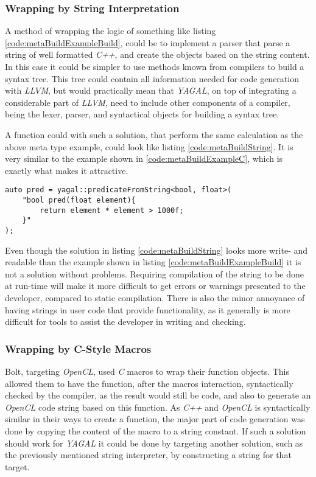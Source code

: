 \subsubsection{Wrapping by String Interpretation}
A method of wrapping the logic of something like listing \ref{code:metaBuildExampleBuild}, could be to implement a parser that parse a string of well formatted \textit{C++}, and create the objects based on the string content. In this case it could be simpler to use methods known from compilers to build a syntax tree. This tree could contain all information needed for code generation with \textit{LLVM}, but would practically mean that \textit{YAGAL}, on top of integrating a considerable part of \textit{LLVM}, need to include other components of a compiler, being the lexer, parser, and syntactical objects for building a syntax tree.

A function could with such a solution, that perform the same calculation as the above meta type example, could look like listing \ref{code:metaBuildString}. It is very similar to the example shown in \ref{code:metaBuildExampleC}, which is exactly what makes it attractive. 

\begin{lstlisting}[caption={Code showing possible construction of kernel with string interpretation.}, label={code:metaBuildString}]
auto pred = yagal::predicateFromString<bool, float>(
    "bool pred(float element){
        return element * element > 1000f;
    }"
);
\end{lstlisting}

Even though the solution in listing \ref{code:metaBuildString} looks more write- and readable than the example shown in listing \ref{code:metaBuildExampleBuild} it is not a solution without problems. Requiring compilation of the string to be done at run-time will make it more difficult to get errors or warnings presented to the developer, compared to static compilation. There is also the minor annoyance of having strings in user code that provide functionality, as it generally is more difficult for tools to assist the developer in writing and checking.

\subsubsection{Wrapping by C-Style Macros}
Bolt, targeting \textit{OpenCL}, used \textit{C} macros to wrap their function objects. This allowed them to have the function, after the macros interaction, syntactically checked by the compiler, as the result would still be code, and also to generate an \textit{OpenCL} code string based on this function. As \textit{C++} and \textit{OpenCL} is syntactically similar in their ways to create a function, the major part of code generation was done by copying the content of the macro to a string constant. If such a solution should work for \textit{YAGAL} it could be done by targeting another solution, such as the previously mentioned string interpreter, by constructing a string for that target.

